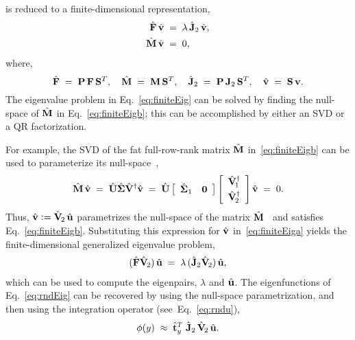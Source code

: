 \documentclass[%
secnumarabic,%
 amssymb, amsmath,%
 aps,prf,superscriptaddress,longbibliography
frontmatterverbose,
]{revtex4-2}
\newcommand{\DefinedAs}[0]{\mathrel{\mathop:}=}
\begin{document}
is reduced to a finite-dimensional representation,
\begin{subequations}\label{eq:finiteEig}
\begin{align}
  \hat{\mathbf{F}}\, \hat{\mathbf{v}} \;&=\; \lambda \, \hat{\mathbf{J}}_2 \,\hat{\mathbf{v}},\label{eq:finiteEiga}\\
  \hat{\mathbf{M}} \, \hat{\mathbf{v}} \;&=\; 0,\label{eq:finiteEigb}
\end{align}
\end{subequations}
where,
$$
\hat{\mathbf{F}} \;=\;  \mathbf{P} \,\mathbf{F} \,\mathbf{S}^T, \quad 
\hat{\mathbf{M}} \;=\;  \mathbf{M} \,\mathbf{S}^T, \quad 
\hat{\mathbf{J}}_2 \;=\;  \mathbf{P} \,\mathbf{J}_2 \,\mathbf{S}^T, \quad 
\hat{\mathbf{v}} \;=\; \mathbf{S}\, \mathbf{v}.
$$
The eigenvalue problem in Eq.~\eqref{eq:finiteEig} can be solved by finding the null-space of $\hat{\mathbf{M}}$ in Eq.~\eqref{eq:finiteEigb}; this can be accomplished by either an SVD or a QR factorization. 

For example, the SVD of the fat full-row-rank matrix $\hat{\mathbf{M}} $ in~\eqref{eq:finiteEigb} can be used to parameterize its null-space~\cite{jovbamSCL06}, 
	\begin{equation}
  \hat{\mathbf{M}}\,\hat{\mathbf{v} }
  \; = \; 
  \hat{\mathbf{U}} \hat{\boldsymbol \Sigma} \hat{\mathbf{V}}^\dagger \hat{\mathbf{v}} 
  \; = \; 
  \hat{\mathbf{U}}  \left[\begin{array}{cc} \hat{\boldsymbol \Sigma}_1 & \mathbf 0 \end{array} \right] \left[\begin{array}{c}\hat{\mathbf{V}}_{\! 1}^\dagger \\[0.3em] \hat{\mathbf{V}}_{\! 2}^\dagger \end{array}\right] \hat{\mathbf{v} }
  \; = \; 
  0.\label{eq:Msvd}
\end{equation}
Thus, $\hat{\HH v} \DefinedAs \hat{\HH V}_{\! 2}\, \hat{\HH u}$ parametrizes the null-space of the matrix $\hat{\mathbf{M}}$~\cite{FourSubspaces} and satisfies Eq.~\eqref{eq:finiteEigb}.  
Substituting this expression for $\hat{\mathbf{v}}$ in~\eqref{eq:finiteEiga} yields the finite-dimensional generalized eigenvalue problem,
\begin{align}
  (\hat{\mathbf{F}} \hat{\mathbf{V}}_{\! 2})\,\hat{\mathbf{u}} \;=\; \lambda \,(\hat{\mathbf{J}}_2 \hat{\mathbf{V}}_{\! 2})\, \hat{\mathbf{u}},
\end{align}
which can be used to compute the eigenpairs, $\lambda$ and $\hat{\mathbf{u}}$. The eigenfunctions of Eq.~\eqref{eq:rndEig} can be recovered by using the null-space parametrization, and then using the integration operator (see~Eq.~\eqref{eq:rndu}),
$$
\phi (y) \;\approx\; \hat{\mathbf{t}}_y^T\; \hat{\mathbf{J}}_2\, \hat{\mathbf{V}}_{\!2} \, \hat{\mathbf{u}}. 
$$
\end{document}
